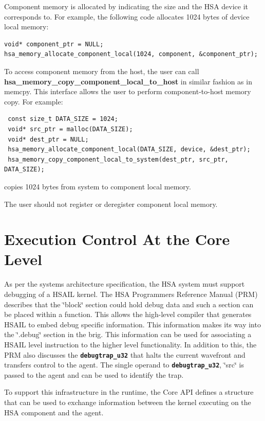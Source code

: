 \documentclass{book}
\newcommand{\diffblock}[1]{#1}
\newcommand{\ttbf}[1]{\diffblock{\texttt{\textbf{#1}}}}
\newcommand{\reffun}[1]{\textbf{#1}}
\begin{document}
Component memory is allocated by indicating the size and the HSA
device it corresponds to. For example, the following code allocates
1024 bytes of device local memory:

\begin{lstlisting}
void* component_ptr = NULL;
hsa_memory_allocate_component_local(1024, component, &component_ptr);
\end{lstlisting}

To access component memory from the host, the user can call
\reffun{hsa\_memory\_copy\_component\_local\_to\_host} in similar
fashion as in memcpy. This interface allows the user to
perform component-\/to-\/host memory copy. For example:

\begin{lstlisting}
 const size_t DATA_SIZE = 1024;
 void* src_ptr = malloc(DATA_SIZE);
 void* dest_ptr = NULL;
 hsa_memory_allocate_component_local(DATA_SIZE, device, &dest_ptr);
 hsa_memory_copy_component_local_to_system(dest_ptr, src_ptr, DATA_SIZE);
\end{lstlisting}

copies 1024 bytes from system to component local memory.

The user should not register or deregister component local memory.


\hypertarget{coreapi_coredebug}{}\section{Execution Control
  At the Core Level}\label{coreapi_coredebug}

As per the systems architecture specification, the HSA system must
support debugging of a HSAIL kernel. The HSA
Programmers Reference Manual (PRM) describes that the
\char`\"{}block\char`\"{} section could hold debug data and such a
section can be placed within a function. This allows the
high-\/level compiler that generates HSAIL to embed debug
specific information. This information makes its way into the
\char`\"{}.\-debug\char`\"{} section in the brig. This information
can be used for associating a HSAIL level instruction to the
higher level functionality. In addition to this, the PRM also
discusses the \ttbf{debugtrap\_u32} that halts the current wavefront
and transfers control to the agent.  The single operand to
\ttbf{debugtrap\_u32}, \char`\"{}src\char`\"{} is passed to the
agent and can be used to identify the trap.

To support this infrastructure in the runtime, the Core API
defines a structure that can be used to exchange information between
the kernel executing on the HSA component and the agent.
\end{document}
